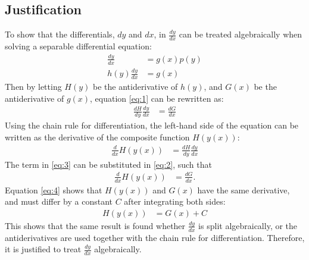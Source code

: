 \subsection{Justification} 
To show that the differentials, $dy$ and $dx$, in $\frac{dy}{dx}$ can be treated algebraically when solving a separable differential equation:
 \begin{align}
	\frac{dy}{dx} &= g(x)p(y)\nonumber\\
	h(y)\frac{dy}{dx} &= g(x)\label{eq:1}
 \end{align}
Then by letting $H(y)$ be the antiderivative of $h(y)$, and $G(x)$ be the antiderivative of $g(x)$, equation \eqref{eq:1} can be rewritten as: 
 \begin{align}
 	\frac{dH}{dy}\frac{dy}{dx} &= \frac{dG}{dx}\label{eq:2}
 \end{align}
Using the chain rule for differentiation, %
the left-hand side of the equation can be written as the derivative of the composite function $H(y(x))$:
 \begin{align}
	\frac{d}{dx} H(y(x)) &= \frac{dH}{dy}\frac{dy}{dx}
	\label{eq:3}
 \end{align}
The term in \eqref{eq:3} can be substituted in \eqref{eq:2}, such that
 \begin{align}
 	\frac{d}{dx}H(y(x)) &= \frac{dG}{dx}\label{eq:4}.
 \end{align}
Equation \eqref{eq:4} shows that $H(y(x))$ and $G(x)$ have the same derivative, and must differ by a constant $C$ after integrating both sides:
 \begin{align*}
 	H(y(x)) &= G(x) + C
 \end{align*}
This shows that the same result is found whether $\frac{dy}{dx}$ is split algebraically, or the antiderivatives are used together with the chain rule for differentiation. Therefore, it is justified to treat $\frac{dy}{dx}$ algebraically.


